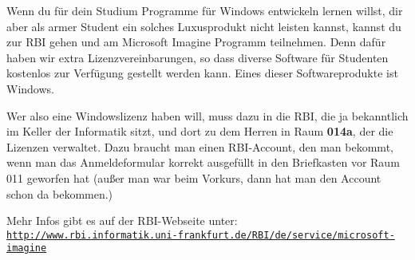 \spaltenanfang
Wenn du f\"ur dein Studium Programme f\"ur Windows entwickeln lernen willst,
dir aber als armer Student ein solches Luxusprodukt nicht leisten kannst,
kannst du zur RBI gehen und am Microsoft Imagine Programm
teilnehmen. Denn daf\"ur haben wir extra Lizenzvereinbarungen, so dass diverse
Software f\"ur Studenten kostenlos zur Verf\"ugung gestellt werden kann.
Eines dieser Softwareprodukte ist Windows.

Wer also eine Windowslizenz haben will, muss dazu in die RBI, die ja bekanntlich im Keller der Informatik sitzt,
und dort zu dem Herren in Raum \textbf{014a}, der die Lizenzen verwaltet. Dazu
braucht man einen RBI-Account, den man bekommt, wenn man das Anmeldeformular
korrekt ausgef\"ullt in den Briefkasten vor Raum 011 geworfen hat (au{\ss}er
man war beim Vorkurs, dann hat man den Account schon da bekommen.)

Mehr Infos gibt es auf der RBI-Webseite unter: \texttt{\url{http://www.rbi.informatik.uni-frankfurt.de/RBI/de/service/microsoft-imagine}}


\spaltenende


